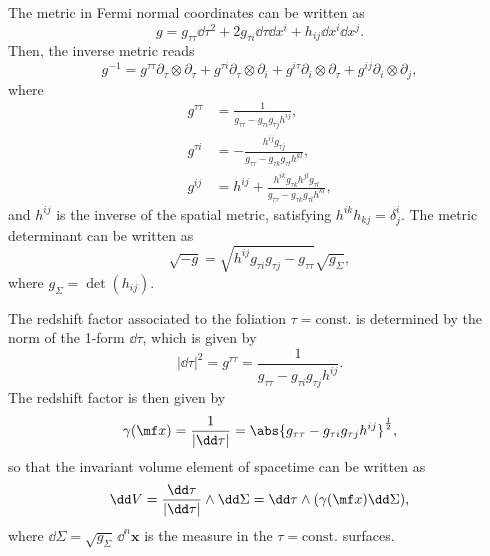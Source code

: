 The metric in Fermi normal coordinates can be written as
\begin{equation}\label{eq:ADM}
    g = g_{\tau\tau}\dd\tau^2 +2g_{\tau i} \dd \tau \dd x^i+h_{ij}\dd x^i \dd x^j.
\end{equation}
Then, the inverse metric reads
\begin{equation}
    g^{-1} = g^{\tau\tau}\partial_\tau\otimes\partial_\tau + g^{\tau i}\partial_\tau \otimes \partial_i+g^{i\tau}\partial_i \otimes \partial_\tau + g^{ij}\partial_i\otimes\partial_j,
\end{equation}
where
\begin{align}
    g^{\tau\tau} &= \frac{1}{g_{\tau\tau} - g_{\tau i}g_{\tau j} h^{ij}},\\
    g^{\tau i} &= -\frac{h^{ij}g_{\tau j}}{g_{\tau\tau} - g_{\tau k}g_{\tau l} h^{kl}},\\
    g^{ij} &= h^{ij} + \frac{h^{ik}g_{\tau k}h^{jl}g_{\tau l}}{g_{\tau\tau} - g_{\tau k}g_{\tau l} h^{kl}},
\end{align}
and $h^{ij}$ is the inverse of the spatial metric, satisfying $h^{ik}h_{kj} = \delta^i_j$. The metric determinant can be written as
\begin{equation}
    \sqrt{-g} = \sqrt{h^{ij}g_{\tau i} g_{\tau j} -g_{\tau\tau}} \sqrt{g_{\Sigma}},
\end{equation}
where $g_{\Sigma} = \det(h_{ij})$.


The redshift factor associated to the foliation \mbox{$\tau = \text{const.}$} is determined by the norm of the 1-form $\dd \tau$, which is given by 
\begin{equation}
    {|\dd \tau|}^2 = g^{\tau\tau} = \frac{1}{g_{\tau\tau} - g_{\tau i}g_{\tau j} h^{ij}}.
\end{equation}
The redshift factor is then given by
\begin{equation}
    \gamma(\mf x) = \frac{1}{|\dd\tau|} = \abs{g_{\tau\tau} - g_{\tau i}g_{\tau j} h^{ij}}^\frac{1}{2},
\end{equation}
so that the invariant volume element of spacetime can be written as
\begin{equation}
    \dd V = \frac{\dd \tau}{|\dd \tau|}\wedge \dd \Sigma = \dd\tau \wedge(\gamma(\mf x) \dd \Sigma),
\end{equation}
where $\dd \Sigma = \sqrt{g_{\Sigma}}\,\dd^n \bm x$ is the measure in the \mbox{$\tau = \text{const}.$} surfaces.





